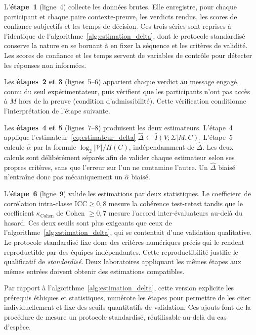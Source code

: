 \begin{sloppypar}
L'\textbf{\'etape~1} (ligne~4) collecte les donn\'ees brutes. Elle
enregistre, pour chaque participant et chaque paire contexte-preuve, les
verdicts rendus, les scores de confiance subjectifs et les
temps de d\'ecision. Ces trois s\'eries sont reprises \`a l'identique de
l'algorithme~\ref{alg:estimation_delta}, dont le protocole standardis\'e
conserve la nature en se bornant \`a en fixer la s\'equence et les crit\`eres
de validit\'e. Les scores de confiance et les temps servent de variables
de contr\^ole pour d\'etecter les r\'eponses non inform\'ees.

Les \textbf{\'etapes~2 et 3} (lignes~5--6) apparient chaque verdict au
message engag\'e, connu du seul exp\'erimentateur, puis v\'erifient que les
participants n'ont pas acc\`es \`a $M$ hors de la preuve (condition
d'admissibilit\'e). Cette v\'erification conditionne l'interpr\'etation de
l'\'etape suivante.

Les \textbf{\'etapes~4 et 5} (lignes~7--8) produisent les deux
estimateurs. L'\'etape~4 applique l'estimateur~\eqref{eq:estimateur_delta}
$\hat\Delta \leftarrow \hat I(V;\Sigma|M,C)$.
L'\'etape~5 calcule $\hat\alpha$ par la formule
$\log_2|\mathcal{V}| / H(C)$, ind\'ependamment de $\hat\Delta$. Les deux calculs sont d\'elib\'er\'ement s\'epar\'es afin de valider
chaque estimateur selon ses propres crit\`eres, sans que l'erreur sur
l'un ne contamine l'autre. Un $\hat\Delta$ biais\'e n'entra\^ine donc pas
m\'ecaniquement un $\hat\alpha$ biais\'e.

L'\textbf{\'etape~6} (ligne~9) valide les estimations par deux
statistiques. Le coefficient de corr\'elation intra-classe
$\mathrm{ICC} \geq 0{,}8$ mesure la coh\'erence test-retest tandis que le
coefficient $\kappa_{\mathrm{Cohen}}$ de Cohen $\geq 0{,}7$ mesure l'accord
inter-\'evaluateurs au-del\`a du hasard. Ces deux seuils sont plus
exigeants que ceux de l'algorithme~\ref{alg:estimation_delta}, qui se
contentait d'une validation qualitative. Le protocole standardis\'e fixe
donc des crit\`eres num\'eriques pr\'ecis qui le rendent reproductible
par des \'equipes ind\'ependantes. Cette reproductibilit\'e justifie le qualificatif
de \emph{standardis\'e}. Deux
laboratoires appliquant les m\^emes \'etapes aux m\^emes entr\'ees doivent
obtenir des estimations compatibles.

Par rapport \`a l'algorithme~\ref{alg:estimation_delta}, cette version
explicite les pr\'erequis \'ethiques et statistiques, num\'erote les \'etapes
pour permettre de les citer individuellement et fixe des seuils quantitatifs
de validation. Ces ajouts font de la proc\'edure de mesure un protocole
standardis\'e, r\'eutilisable au-del\`a du cas d'esp\`ece.
\end{sloppypar}

